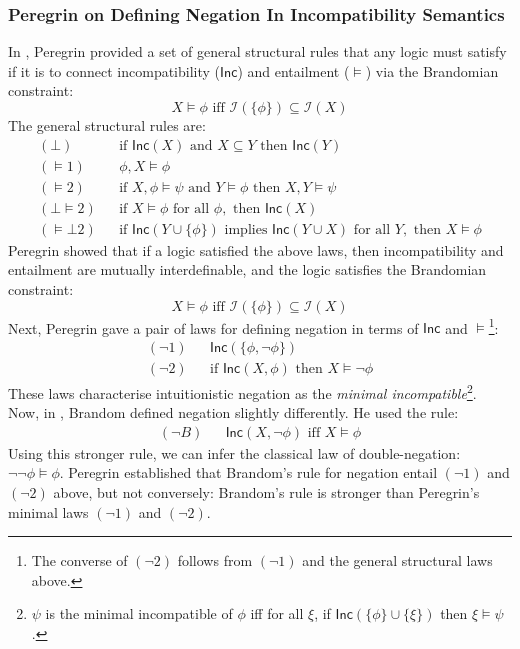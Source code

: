 \subsubsection{Peregrin on Defining Negation In Incompatibility Semantics}\label{peregrin}

In \cite{peregrin}, Peregrin provided a set of general structural rules that any logic must satisfy if it is to connect incompatibility ($\mathsf{Inc}$) and entailment ($\models$) via the Brandomian constraint:
\[
X \models \phi \text{ iff } \mathcal{I}(\{\phi\}) \subseteq \mathcal{I}(X)
\]
The general structural rules are:
\begin{eqnarray*}
(\bot) & & \text{if } \mathsf{Inc}(X) \text{ and } X \subseteq Y \text{ then } \mathsf{Inc}(Y) \\
(\models 1) & & \phi, X \models \phi \\
(\models 2) & & \text{if }X, \phi \models \psi \text{ and } Y \models \phi \text{ then } X, Y \models \psi \\
(\bot \models 2) & & \text{if } X \models \phi \text{ for all } \phi, \text{ then } \mathsf{Inc}(X) \\
(\models \bot 2) & & \text{if } \mathsf{Inc}(Y \cup \{\phi\}) \text{ implies } \mathsf{Inc}(Y \cup X) \text{ for all } Y, \text{ then } X \models \phi
\end{eqnarray*}
Peregrin showed that if a logic satisfied the above laws, then incompatibility and entailment are mutually interdefinable, and the logic satisfies the Brandomian constraint:
\[
X \models \phi \text{ iff } \mathcal{I}(\{\phi\}) \subseteq \mathcal{I}(X)
\]
Next, Peregrin gave a pair of laws for defining negation in terms of $\mathsf{Inc}$ and $\models$\footnote{The converse of $(\neg 2)$ follows from $(\neg 1)$ and the general structural laws above.}:
\begin{eqnarray*}
(\neg 1) & & \mathsf{Inc}(\{\phi, \neg \phi\}) \\
(\neg 2) & & \text{if } \mathsf{Inc}(X, \phi) \text{ then } X \models \neg \phi
\end{eqnarray*}
These laws characterise intuitionistic negation as the \emph{minimal incompatible}\footnote{$\psi$ is the minimal incompatible of $\phi$ iff for all $\xi$, if $\mathsf{Inc}(\{\phi\} \cup \{\xi\})$ then $\xi \models \psi$.}.
Now, in \cite{brandom}, Brandom defined negation slightly differently. He used the rule:
\begin{eqnarray*}
(\neg B) & &\mathsf{Inc}(X, \neg \phi) \text{ iff } X \models \phi
\end{eqnarray*}
Using this stronger rule, we can infer the classical law of double-negation: $\neg \neg \phi \models \phi$.
Peregrin established that Brandom's rule for negation entail $(\neg 1)$ and $(\neg 2)$ above, but not conversely: Brandom's rule is stronger than Peregrin's minimal laws $(\neg 1)$ and $(\neg 2)$.

